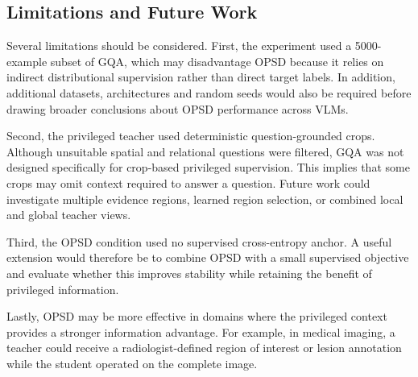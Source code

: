 \subsection{Limitations and Future Work}

Several limitations should be considered. First, the experiment used a 5000-example subset of
GQA, which may disadvantage OPSD because it relies on indirect distributional supervision rather than
direct target labels. In addition, additional datasets, architectures and random seeds 
would also be required before drawing broader conclusions about OPSD performance across VLMs. 

Second, the privileged teacher used deterministic question-grounded crops. Although unsuitable
spatial and relational questions were filtered, GQA was not designed specifically for crop-based privileged
supervision. This implies that some crops may omit context required to answer a question. Future work
could investigate multiple evidence regions, learned region selection, or combined local and global teacher views.

Third, the OPSD condition used no supervised cross-entropy anchor. A useful extension would therefore be to
combine OPSD with a small supervised objective and evaluate whether this improves stability while
retaining the benefit of privileged information.

Lastly, OPSD may be more effective in domains where the privileged context provides a stronger
information advantage. For example, in medical imaging, a teacher could receive a radiologist-defined
region of interest or lesion annotation while the student operated on the complete image. 